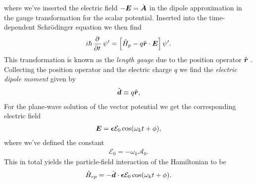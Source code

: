             where we've inserted the electric field $-\boldsymbol{E} = \dot{\boldsymbol{A}}$
            in the dipole approximation in the gauge transformation for the
            scalar potential.
            Inserted into the time-dependent Schrödinger equation we then find
            \begin{align}
                i\hslash\dpd{}{t}\psi'
                = \brak{
                    \hamil_p
                    - q\positionvec\cdot\vfg{E}
                }\psi'.
            \end{align}
            This transformation is known as the \emph{length gauge} due to the
            position operator $\hat{\boldsymbol{r}}$ \cite{joachain2012atoms}.
            Collecting the position operator and the electric charge $q$ we find
            the \emph{electric dipole moment} given by
            \begin{align}
                \hat{\boldsymbol{d}}
                \equiv
                q\hat{\boldsymbol{r}},
            \end{align}
            For the plane-wave solution of the vector potential we get the
            corresponding electric field
            \begin{align}
                \boldsymbol{E}
                = \boldsymbol{\epsilon}\mathcal{E}_0\cos(\omega_k t + \phi),
            \end{align}
            where we've defined the constant
            \begin{align}
                \mathcal{E}_0 = -\omega_k \mathcal{A}_0.
                \label{eq:electric-field-constant}
            \end{align}
            This in total yields the particle-field interaction of the
            Hamiltonian to be
            \begin{align}
                \hat{H}_{ep}
                = -\hat{\boldsymbol{d}}\cdot\boldsymbol{\epsilon}
                \mathcal{E}_0\cos(\omega_k t + \phi).
            \end{align}



